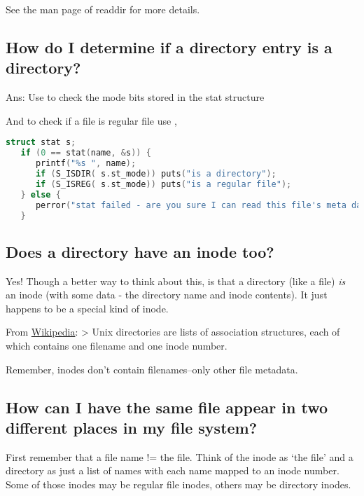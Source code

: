 See the man page of readdir for more details.

\subsection{How do I determine if a directory entry is a directory?}\label{how-do-i-determine-if-a-directory-entry-is-a-directory}

Ans: Use  to check the mode bits stored in the stat structure

And to check if a file is regular file use ,

\begin{lstlisting}[language=C]
   struct stat s;
   if (0 == stat(name, &s)) {
      printf("%s ", name);
      if (S_ISDIR( s.st_mode)) puts("is a directory");
      if (S_ISREG( s.st_mode)) puts("is a regular file");
   } else {
      perror("stat failed - are you sure I can read this file's meta data?");
   }
\end{lstlisting}

\subsection{Does a directory have an inode too?}\label{does-a-directory-have-an-inode-too}

Yes! Though a better way to think about this, is that a directory (like a file) \emph{is} an inode (with some data - the directory name and inode contents). It just happens to be a special kind of inode.

From \href{http://en.wikipedia.org/wiki/Inode}{Wikipedia}: \textgreater{} Unix directories are lists of association structures, each of which contains one filename and one inode number.

Remember, inodes don't contain filenames--only other file metadata.

\subsection{How can I have the same file appear in two different places in my file system?}\label{how-can-i-have-the-same-file-appear-in-two-different-places-in-my-file-system}

First remember that a file name != the file. Think of the inode as `the file' and a directory as just a list of names with each name mapped to an inode number. Some of those inodes may be regular file inodes, others may be directory inodes.

